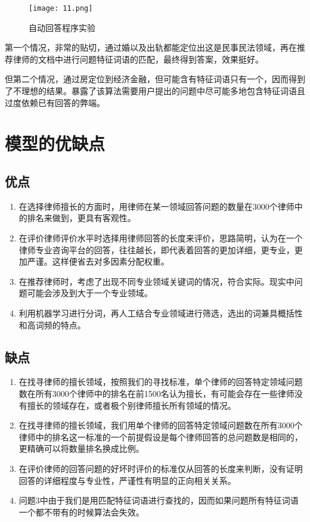 \documentclass[bwprint]{cumcmthesis}
\begin{document}
\begin{figure}[!htp]
\centering
\texttt{[image: 11.png]}
\caption{自动回答程序实验}
\label{自动回答程序实验}
\end{figure}

第一个情况，非常的贴切，通过婚以及出轨都能定位出这是民事民法领域，再在推荐律师的文档中进行问题特征词语的匹配，最终得到答案，效果挺好。

但第二个情况，通过房定位到经济金融，但可能含有特征词语只有一个，因而得到了不理想的结果。暴露了该算法需要用户提出的问题中尽可能多地包含特征词语且过度依赖已有回答的弊端。


\section{模型的优缺点}

\subsection{优点}
\begin{enumerate}
	\item 在选择律师擅长的方面时，用律师在某一领域回答问题的数量在3000个律师中的排名来做到，更具有客观性。
	\item 在评价律师评价水平时选择用律师回答的长度来评价，思路简明，认为在一个律师专业咨询平台的回答，往往越长，即代表着回答的更加详细，更专业，更加严谨。这样便省去对多因素分配权重。
	\item 在推荐律师时，考虑了出现不同专业领域关键词的情况，符合实际。现实中问题可能会涉及到大于一个专业领域。
	\item 利用机器学习进行分词，再人工结合专业领域进行筛选，选出的词兼具概括性和高词频的特点。
\end{enumerate}

\subsection{缺点}

\begin{enumerate}
	\item 在找寻律师的擅长领域，按照我们的寻找标准，单个律师的回答特定领域问题数在所有3000个律师中的排名在前1500名认为擅长，有可能会存在一些律师没有擅长的领域存在，或者极个别律师擅长所有领域的情况。
	\item 在找寻律师的擅长领域，我们用单个律师的回答特定领域问题数在所有3000个律师中的排名这一标准的一个前提假设是每个律师回答的总问题数是相同的，更精确可以将数量排名换成比例。
	\item 在评价律师的回答问题的好坏时评价的标准仅从回答的长度来判断，没有证明回答的详细程度与专业性，严谨性有明显的正向相关关系。
	\item 问题3中由于我们是用匹配特征词语进行查找的，因而如果问题所有特征词语一个都不带有的时候算法会失效。
\end{enumerate}
\end{document}
